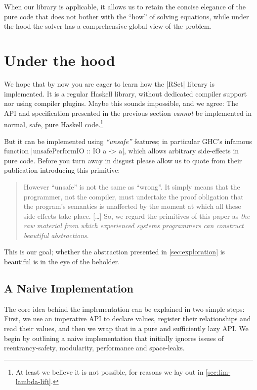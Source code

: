 \documentclass[manuscript,screen,acmsmall,nonacm]{acmart}
\begin{document}
When our library is applicable, it allows us to retain the concise elegance of the pure code that does not bother with the “how” of solving equations, while under the hood the solver has a comprehensive global view of the problem.


\section{Under the hood}\label{sec:impl}

We hope that by now you are eager to learn how the |RSet| library is implemented. It is a regular Haskell library, without dedicated compiler support nor using compiler plugins. Maybe this sounds impossible, and we agree: The API and specification presented in the previous section \emph{cannot} be implemented in normal, safe, pure Haskell code.\footnote{At least we believe it is not possible, for reasons we lay out in \cref{sec:lim-lambda-lift}.}

But it can be implemented using \emph{“unsafe”} features; in particular GHC's infamous function |unsafePerformIO :: IO a -> a|, which allows arbitrary side-effects in pure code. Before you turn away in disgust please allow us to quote \citet{unsafePerformIO} from their publication introducing this primitive:
\begin{quote}
However “unsafe” is not the same as “wrong”. It simply means that the programmer, not the compiler, must undertake the proof obligation that the program's semantics is unaffected by the moment at which all these side effects take place. [\ldots]
So, we regard the primitives of this paper as \emph{the raw material from which experienced systems programmers can construct beautiful abstractions}.
\end{quote}
This is our goal; whether the abstraction presented in \cref{sec:exploration} is beautiful is in the eye of the beholder.

\subsection{A Naive Implementation}

The core idea behind the implementation can be explained in two simple steps: First, we use an imperative API to declare values, register their relationships and read their values, and then we wrap that in a pure and sufficiently lazy API. We begin by outlining a naive implementation that initially ignores issues of reentrancy-safety, modularity, performance and space-leaks.
\end{document}
